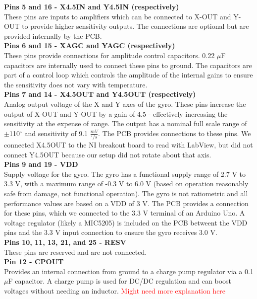 \documentclass{article}
\newcommand{\xxx}[1]{\textcolor{red}{#1}}
\theoremstyle{plain}
\theoremstyle{definition}
\theoremstyle{remark}
\begin{document}
\textbf{Pins 5 and 16 - X4.5IN and Y4.5IN (respectively)}\\
These pins are inputs to amplifiers which can be connected to X-OUT and Y-OUT to provide higher sensitivity outputs. The connections are optional but are provided internally by the PCB.\\

\textbf{Pins 6 and 15 - XAGC and YAGC (respectively)}\\
These pins provide connections for amplitude control capacitors. 0.22 $\mu$F capacitors are internally used to connect these pins to ground. The capacitors are part of a control loop which controls the amplitude of the internal gains to ensure the sensitivity does not vary with temperature.\\

\textbf{Pins 7 and 14 - X4.5OUT and Y4.5OUT (respectively)}\\
Analog output voltage of the X and Y axes of the gyro. These pins increase the output of X-OUT and Y-OUT by a gain of 4.5 - effectively increasing the sensitivity at the expense of range. The output has a nominal full scale range of $\pm$110$^{\circ}$ and sensitivity of 9.1 $\frac{mV}{^{\circ}/s}$. The PCB provides connections to these pins. We connected X4.5OUT to the NI breakout board to read with LabView, but did not connect Y4.5OUT because our setup did not rotate about that axis.\\

\textbf{Pins 9 and 19 - VDD}\\
Supply voltage for the gyro. The gyro has a functional supply range of 2.7 V to 3.3 V, with a maximum range of -0.3 V to 6.0 V (based on operation reasonably safe from damage, not functional operation). The gyro is not ratiometric and all performance values are based on a VDD of 3 V. The PCB provides a connection for these pins, which we connected to the 3.3 V terminal of an Arduino Uno. A voltage regulator (likely a MIC5205) is included on the PCB betweent the VDD pins and the 3.3 V input connection to ensure the gyro receives 3.0 V. \\ 

\textbf{Pins 10, 11, 13, 21, and 25 - RESV}\\
These pins are reserved and are not connected.\\

\textbf{Pin 12 - CPOUT}\\
Provides an internal connection from ground to a charge pump regulator via a 0.1 $\mu$F capacitor. A charge pump is used for DC/DC regulation and can boost voltages without needing an inductor. \xxx{Might need more explanation here}\\
\end{document}
